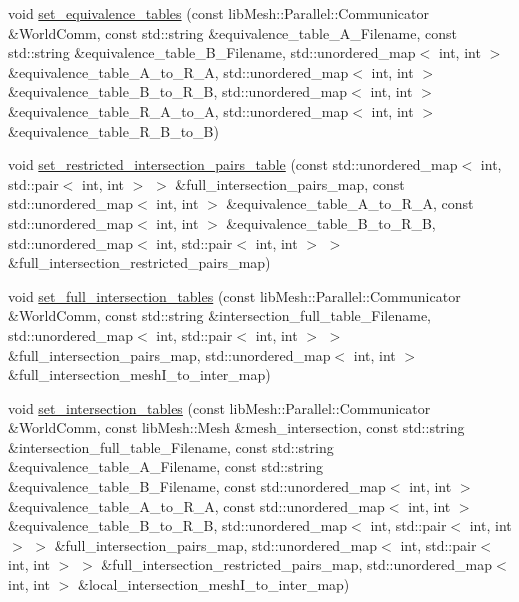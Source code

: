 \begin{DoxyCompactItemize}
\item 
void \hyperlink{namespacecarl_a995bb6a3c01d8cede8268c2f39ce0768}{set\+\_\+equivalence\+\_\+tables} (const lib\+Mesh\+::\+Parallel\+::\+Communicator \&World\+Comm, const std\+::string \&equivalence\+\_\+table\+\_\+\+A\+\_\+\+Filename, const std\+::string \&equivalence\+\_\+table\+\_\+\+B\+\_\+\+Filename, std\+::unordered\+\_\+map$<$ int, int $>$ \&equivalence\+\_\+table\+\_\+\+A\+\_\+to\+\_\+\+R\+\_\+\+A, std\+::unordered\+\_\+map$<$ int, int $>$ \&equivalence\+\_\+table\+\_\+\+B\+\_\+to\+\_\+\+R\+\_\+\+B, std\+::unordered\+\_\+map$<$ int, int $>$ \&equivalence\+\_\+table\+\_\+\+R\+\_\+\+A\+\_\+to\+\_\+\+A, std\+::unordered\+\_\+map$<$ int, int $>$ \&equivalence\+\_\+table\+\_\+\+R\+\_\+\+B\+\_\+to\+\_\+\+B)
\item 
void \hyperlink{namespacecarl_a17eb70b3f2c2574e7b3085108205e38c}{set\+\_\+restricted\+\_\+intersection\+\_\+pairs\+\_\+table} (const std\+::unordered\+\_\+map$<$ int, std\+::pair$<$ int, int $>$ $>$ \&full\+\_\+intersection\+\_\+pairs\+\_\+map, const std\+::unordered\+\_\+map$<$ int, int $>$ \&equivalence\+\_\+table\+\_\+\+A\+\_\+to\+\_\+\+R\+\_\+\+A, const std\+::unordered\+\_\+map$<$ int, int $>$ \&equivalence\+\_\+table\+\_\+\+B\+\_\+to\+\_\+\+R\+\_\+\+B, std\+::unordered\+\_\+map$<$ int, std\+::pair$<$ int, int $>$ $>$ \&full\+\_\+intersection\+\_\+restricted\+\_\+pairs\+\_\+map)
\item 
void \hyperlink{namespacecarl_a0fef8616ca5e61709ef9a013c8a2ee43}{set\+\_\+full\+\_\+intersection\+\_\+tables} (const lib\+Mesh\+::\+Parallel\+::\+Communicator \&World\+Comm, const std\+::string \&intersection\+\_\+full\+\_\+table\+\_\+\+Filename, std\+::unordered\+\_\+map$<$ int, std\+::pair$<$ int, int $>$ $>$ \&full\+\_\+intersection\+\_\+pairs\+\_\+map, std\+::unordered\+\_\+map$<$ int, int $>$ \&full\+\_\+intersection\+\_\+mesh\+I\+\_\+to\+\_\+inter\+\_\+map)
\item 
void \hyperlink{namespacecarl_a880bd07cae964f085e21e5ac75ede10d}{set\+\_\+intersection\+\_\+tables} (const lib\+Mesh\+::\+Parallel\+::\+Communicator \&World\+Comm, const lib\+Mesh\+::\+Mesh \&mesh\+\_\+intersection, const std\+::string \&intersection\+\_\+full\+\_\+table\+\_\+\+Filename, const std\+::string \&equivalence\+\_\+table\+\_\+\+A\+\_\+\+Filename, const std\+::string \&equivalence\+\_\+table\+\_\+\+B\+\_\+\+Filename, const std\+::unordered\+\_\+map$<$ int, int $>$ \&equivalence\+\_\+table\+\_\+\+A\+\_\+to\+\_\+\+R\+\_\+\+A, const std\+::unordered\+\_\+map$<$ int, int $>$ \&equivalence\+\_\+table\+\_\+\+B\+\_\+to\+\_\+\+R\+\_\+\+B, std\+::unordered\+\_\+map$<$ int, std\+::pair$<$ int, int $>$ $>$ \&full\+\_\+intersection\+\_\+pairs\+\_\+map, std\+::unordered\+\_\+map$<$ int, std\+::pair$<$ int, int $>$ $>$ \&full\+\_\+intersection\+\_\+restricted\+\_\+pairs\+\_\+map, std\+::unordered\+\_\+map$<$ int, int $>$ \&local\+\_\+intersection\+\_\+mesh\+I\+\_\+to\+\_\+inter\+\_\+map)

\end{DoxyCompactItemize}
